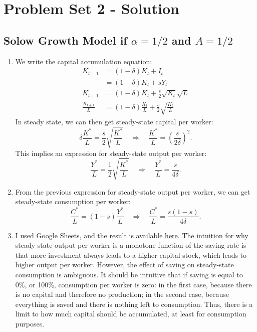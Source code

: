 \documentclass[]{book}
\theoremstyle{definition}
\theoremstyle{definition}
\theoremstyle{definition}
\theoremstyle{remark}
\begin{document}
\chapter*{Problem Set 2 - Solution}\label{problem-set-2---solution}

\section*{\texorpdfstring{Solow Growth Model if \(\alpha = 1/2\) and
\(A=1/2\)}{Solow Growth Model if \textbackslash{}alpha = 1/2 and A=1/2}}\label{solow-growth-model-if-alpha-12-and-a12-1}

\begin{enumerate}
\def\labelenumi{\arabic{enumi}.}
\item
  We write the capital accumulation equation: \[\begin{aligned}
  K_{t+1}&=(1-\delta)K_{t}+I_{t}\\
  &=(1-\delta)K_{t}+sY_{t}\\
  K_{t+1} &=(1-\delta)K_{t}+\frac{s}{2}\sqrt{K_{t}}\sqrt{L}\\
  \frac{K_{t+1}}{L}&=(1-\delta)\frac{K_{t}}{L}+\frac{s}{2}\sqrt{\frac{K_{t}}{L}}
  \end{aligned}\] In steady state, we can then get steady-state capital
  per worker:
  \[\delta\frac{K^{*}}{L}=\frac{s}{2}\sqrt{\frac{K^{*}}{L}}\quad\Rightarrow\quad\boxed{\frac{K^{*}}{L}=\left(\frac{s}{2\delta}\right)^{2}}.\]
  This implies an expression for steady-state output per worker:
  \[\frac{Y^{*}}{L}=\frac{1}{2}\sqrt{\frac{K^{*}}{L}} \quad \Rightarrow \quad \boxed{\frac{Y^{*}}{L}=\frac{s}{4\delta}}.\]
\item
  From the previous expression for steady-state output per worker, we
  can get steady-state consumption per worker:
  \[\frac{C^{*}}{L}=(1-s)\frac{Y^{*}}{L}\quad\Rightarrow\quad\boxed{\frac{C^{*}}{L}=\frac{s(1-s)}{4\delta}}.\]
\item
  I used Google Sheets, and the result is available
  \href{https://docs.google.com/spreadsheets/d/1dkygwhDNT79cU_mTVXWal4RyGwX38OTnu5iS5UTz1fc/edit?usp=sharing}{here}.
  The intuition for why steady-state output per worker is a monotone
  function of the saving rate is that more investment always leads to a
  higher capital stock, which leads to higher output per worker.
  However, the effect of saving on steady-state consumption is
  ambiguous. It should be intuitive that if saving is equal to 0\%, or
  100\%, consumption per worker is zero: in the first case, because
  there is no capital and therefore no production; in the second case,
  because everything is saved and there is nothing left to consumption.
  Thus, there is a limit to how much capital should be accumulated, at
  least for consumption purposes.
\end{enumerate}
\end{document}
